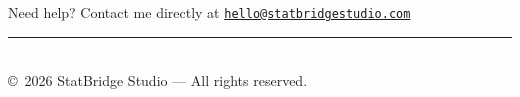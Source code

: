 \documentclass[11pt,a4paper]{article}
\begin{document}
\vspace{3em}

\begin{center}
    \textcolor{textlight}{Need help? Contact me directly at} \href{mailto:hello@statbridgestudio.com}{\texttt{hello@statbridgestudio.com}} \\[1.5em]
    \rule{0.5\linewidth}{0.5pt} \\
    \vspace{0.5em}
    \footnotesize \textcolor{textlight}{\copyright\ 2026 StatBridge Studio — All rights reserved.}
\end{center}
\end{document}
